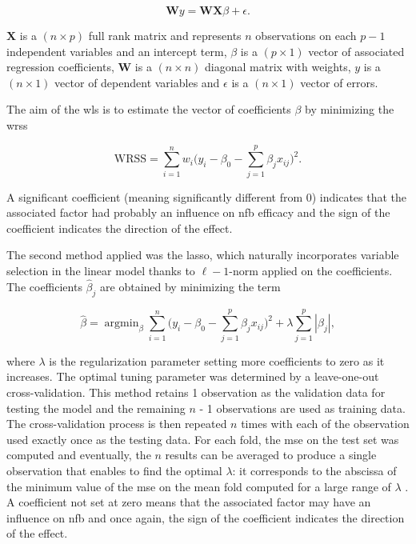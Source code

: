 \documentclass[12pt,a4paper,english]{article}
\DeclareMathOperator*{\argmin}{argmin}
\begin{document}
\begin{equation}
\label{eq:factors_model_WLS}
\textbf{W}y = \textbf{WX}\beta + \epsilon.
\end{equation}

$\textbf{X}$ is a $(n \times p)$ full rank matrix and represents $n$ observations on each $p-1$ independent variables and an 
intercept term, $\beta$ is a $(p \times 1)$ vector of associated regression coefficients, $\textbf{W}$ is a $(n \times n)$ diagonal 
matrix with weights, $y$ is a $(n \times 1)$ vector of dependent variables and $\epsilon$ is a $(n \times 1)$ vector of errors.

The aim of the \gls{wls} is to estimate the vector of coefficients $\beta$ by minimizing the \gls{wrss}

\begin{equation}
\label{eq:factors_WRSS}
\text{WRSS} = \sum_{i=1}^{n} w_i \Big(y_i - \beta_{0} - \sum_{j=1}^{p}\beta_{j}x_{ij}\Big)^2.
\end{equation}

A significant coefficient (meaning significantly different from 0) indicates that the associated factor had probably an influence on \gls{nfb} efficacy and the sign 
of the coefficient indicates the direction of the effect.

The second method applied was the \gls{lasso}, which naturally incorporates variable selection 
in the linear model thanks to $\ell-1$-norm applied on the coefficients. The coefficients $\hat{\beta}_j$ are obtained by minimizing the term

\begin{equation}
\label{eq:factors_lasso-minimization}
\hat{\beta} = \argmin_\beta \sum_{i=1}^{n} \Big(y_i - \beta_{0} - \sum_{j=1}^{p}\beta_{j}x_{ij}\Big)^2 + \lambda \sum_{j=1}^{p}|\beta_{j}|,
\end{equation} 

where $\lambda$ is the regularization parameter setting more coefficients to zero as it increases. The optimal tuning parameter was determined 
by a leave-one-out cross-validation. This method retains 1 observation as the validation data for testing the model and the 
remaining $n$ - 1 observations are used as training data. The cross-validation process is then repeated $n$ times with each of the observation 
used exactly once as the testing data. For each fold, the \gls{mse} on the test set was computed and eventually, the $n$ results can 
be averaged to produce a single observation that enables to find the optimal $\lambda$: it corresponds to the abscissa of the minimum
value of the \gls{mse} on the mean fold computed for a large range of $\lambda$ \citep{James2013}. 
A coefficient not set at zero means that the associated factor may have an influence on \gls{nfb} and once again,
the sign of the coefficient indicates the direction of the effect.
\end{document}
